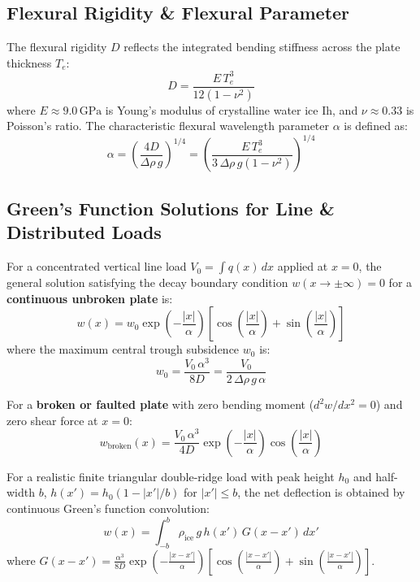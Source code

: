\documentclass[11pt,a4paper]{article}
\begin{document}
\subsection{Flexural Rigidity \& Flexural Parameter}
The flexural rigidity $D$ reflects the integrated bending stiffness across the plate thickness $T_e$:
\begin{equation}
D = \frac{E \, T_e^3}{12(1 - \nu^2)}
\label{eq:rigidity}
\end{equation}
where $E \approx 9.0\,\text{GPa}$ is Young's modulus of crystalline water ice Ih, and $\nu \approx 0.33$ is Poisson's ratio. The characteristic flexural wavelength parameter $\alpha$ is defined as:
\begin{equation}
\alpha = \left( \frac{4D}{\Delta\rho \, g} \right)^{1/4} = \left( \frac{E \, T_e^3}{3 \, \Delta\rho \, g (1 - \nu^2)} \right)^{1/4}
\label{eq:alpha}
\end{equation}

\subsection{Green's Function Solutions for Line \& Distributed Loads}
For a concentrated vertical line load $V_0 = \int q(x)\,dx$ applied at $x = 0$, the general solution satisfying the decay boundary condition $w(x \to \pm\infty) = 0$ for a \textbf{continuous unbroken plate} is:
\begin{equation}
w(x) = w_0 \exp\left(-\frac{|x|}{\alpha}\right) \left[ \cos\left(\frac{|x|}{\alpha}\right) + \sin\left(\frac{|x|}{\alpha}\right) \right]
\label{eq:w_unbroken}
\end{equation}
where the maximum central trough subsidence $w_0$ is:
\begin{equation}
w_0 = \frac{V_0 \, \alpha^3}{8D} = \frac{V_0}{2 \, \Delta\rho \, g \, \alpha}
\label{eq:w0_unbroken}
\end{equation}

For a \textbf{broken or faulted plate} with zero bending moment ($d^2w/dx^2 = 0$) and zero shear force at $x = 0$:
\begin{equation}
w_{\text{broken}}(x) = \frac{V_0 \, \alpha^3}{4D} \exp\left(-\frac{|x|}{\alpha}\right) \cos\left(\frac{|x|}{\alpha}\right)
\label{eq:w_broken}
\end{equation}

For a realistic finite triangular double-ridge load with peak height $h_0$ and half-width $b$, $h(x') = h_0(1 - |x'|/b)$ for $|x'| \le b$, the net deflection is obtained by continuous Green's function convolution:
\begin{equation}
w(x) = \int_{-b}^{b} \rho_{\text{ice}} \, g \, h(x') \, G(x - x') \, dx'
\label{eq:convolution}
\end{equation}
where $G(x - x') = \frac{\alpha^3}{8D} \exp\left(-\frac{|x-x'|}{\alpha}\right) \left[ \cos\left(\frac{|x-x'|}{\alpha}\right) + \sin\left(\frac{|x-x'|}{\alpha}\right) \right]$.
\end{document}
